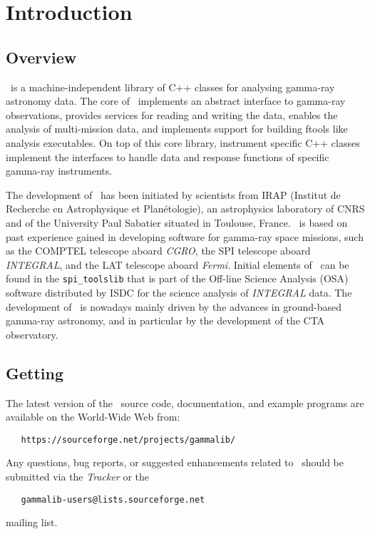 \documentclass{article}[12pt,a4]
\begin{document}
\frontpage


\section{Introduction}

\subsection{Overview}

\this\ is a machine-independent library of C++ classes for analysing gamma-ray astronomy
data.
The core of \this\ implements an abstract interface to gamma-ray observations,
provides services for reading and writing the data,
enables the analysis of multi-mission data,
and implements support for building ftools like analysis executables.
On top of this core library, instrument specific C++ classes implement the interfaces to
handle data and response functions of specific gamma-ray instruments.

The development of \this\ has been initiated by scientists from IRAP (Institut de Recherche
en Astrophysique et Plan\'etologie), an astrophysics laboratory of CNRS and of the University
Paul Sabatier situated in Toulouse, France.
\this\ is based on past experience gained in developing software for gamma-ray space
missions, such as
the COMPTEL telescope aboard {\em CGRO}, 
the SPI telescope aboard {\em INTEGRAL},
and the LAT telescope aboard {\em Fermi}.
Initial elements of \this\ can be found in the {\tt spi\_toolslib} that is part of the
Off-line Science Analysis (OSA) software distributed by ISDC for the science analysis 
of {\em INTEGRAL} data.
The development of \this\ is nowadays mainly driven by the advances in 
ground-based gamma-ray astronomy, and in particular by the development of the
CTA observatory.


\subsection{Getting \this}

The latest version of the \this\ source code, documentation, and example programs are
available on the World-Wide Web from:
\begin{verbatim}
   https://sourceforge.net/projects/gammalib/
\end{verbatim}
Any questions, bug reports, or suggested enhancements related to \this\ should be submitted
via the {\em Tracker} or the
\begin{verbatim}
   gammalib-users@lists.sourceforge.net
\end{verbatim}
mailing list.
\end{document}
